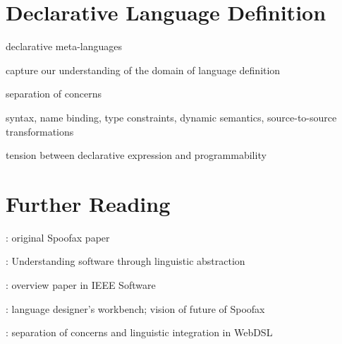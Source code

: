 \section{Declarative Language Definition}

declarative meta-languages

capture our understanding of the domain of language definition

separation of concerns

syntax, name binding, type constraints, dynamic semantics, source-to-source
transformations


tension between declarative expression and programmability

\section{Further Reading}

\cite{KatsV10}: original Spoofax paper

\cite{Visser15}: Understanding software through linguistic abstraction

\cite{WachsmuthKV14}: overview paper in IEEE Software

\cite{VisserOnward14}: language designer's workbench; vision of future of
Spoofax

\cite{GroenewegenHV10}: separation of concerns and linguistic integration in
WebDSL \cite{Visser07}




